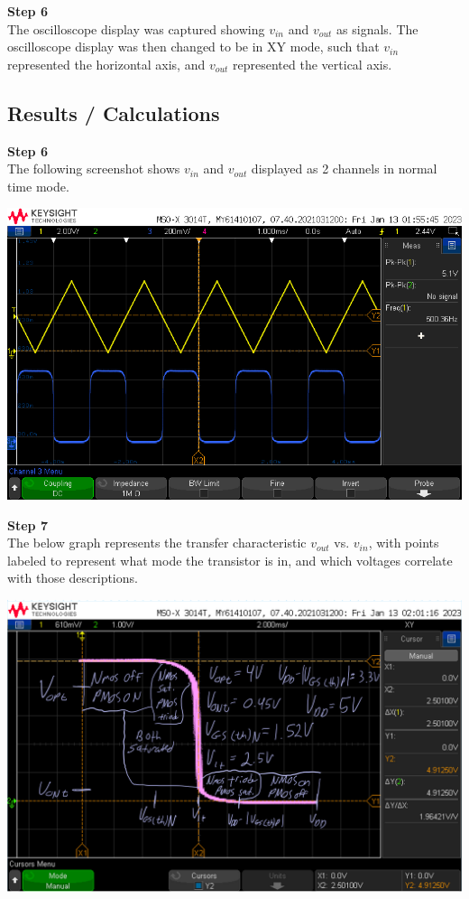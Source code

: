 \documentclass[notitlepage, 12pt]{report}  %
\begin{document}
\textbf{Step 6}\\
The oscilloscope display was captured showing $v_{in}$ and $v_{out}$ as signals. The oscilloscope display was then changed 
to be in XY mode, such that $v_{in}$ represented the horizontal axis, and $v_{out}$ represented the vertical axis.\\


\subsection*{Results / Calculations}

\textbf{Step 6}\\

The following screenshot shows $v_{in}$ and $v_{out}$ displayed as 2 channels in normal time mode.\\

\begin{center}
    \includegraphics[scale=0.5]{scope2.png}
\end{center}

\textbf{Step 7}\\

\vspace{4pt}
The below graph represents the transfer characteristic $v_{out}$ vs. $v_{in}$, with points labeled to represent
what mode the transistor is in, and which voltages correlate with those descriptions.\\

\begin{center}
    \includegraphics[scale=0.4]{scope3.png}
\end{center}
\end{document}
